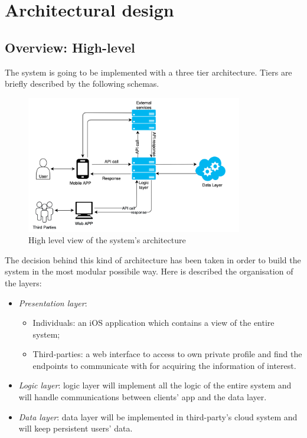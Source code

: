 \documentclass[DD.tex]{subfiles}
\begin{document}
\section{Architectural design}
\subsection{Overview: High-level}

The system is going to be implemented with a three tier architecture. \newline Tiers are briefly described by the following schemas.

\begin{figure}[h!]
	\centering
	\includegraphics[height=6.00cm,keepaspectratio]{Figures/GeneralSchema}
	\caption{High level view of the system's architecture}
\end{figure}

The decision behind this kind of architecture has been taken in order to build the system in the most modular possibile way. Here is described the organisation of the layers: 

\begin{itemize}
	\item \textit{Presentation layer}:\begin{itemize}
			\item {Individuals}: an iOS application which contains a view of the entire system;
			\item {Third-parties}: a web interface to access to own private profile and find the endpoints to communicate with for acquiring the information of interest.
			\end{itemize}
	\item \textit{Logic layer}: logic layer will implement all the logic of the entire system and will handle communications between clients' app and the data layer.
	\item \textit{Data layer}: data layer will be implemented in third-party's cloud system and will keep persistent users' data.
\end{itemize}
\end{document}
